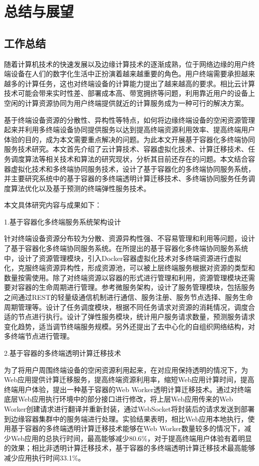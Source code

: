 \chapter{总结与展望 }\label{chap:summary_and_future_work}

\section{工作总结}

随着计算机技术的快速发展以及边缘计算技术的逐渐成熟，位于网络边缘的用户终端设备在人们的数字化生活中正扮演着越来越重要的角色。用户终端需要承担越来越多的计算任务，这也对终端设备的计算能力提出了越来越高的要求。相比云计算技术可能会带来实时性差、部署成本高、带宽拥挤等问题，利用靠近用户的设备上空闲的计算资源协同为用户终端提供就近的计算服务成为一种可行的解决方案。

基于终端设备资源的分散性、异构性等特点，如何将边缘终端设备的空闲资源管理起来并利用多终端设备协同提供服务以达到提高终端资源利用效率、提高终端用户体验的目的，成为本文需要重点解决的问题。为此本文开展基于容器化多终端协同服务技术研究。本文首先介绍了云计算技术、容器虚拟化技术、计算迁移技术、任务调度算法等相关技术和算法的研究现状，分析其目前还存在的问题。本文结合容器虚拟化技术和多终端协同服务技术，设计了基于容器化的多终端协同服务系统，并主要研究系统中的基于容器的多终端透明计算迁移技术、多终端协同服务任务调度算法优化以及基于预测的终端弹性服务技术。

本文具体研究内容与成果如下：

1.基于容器化多终端服务系统架构设计

针对终端设备资源分布较为分散、资源异构性强、不容易管理和利用等问题，设计了基于容器化多终端协同服务系统。在所提出的基于容器化多终端协同服务系统中，设计了资源管理模块，引入Docker容器虚拟化技术对多终端资源进行虚拟化，克服终端资源异构性，形成资源池，可以被上层终端服务根据对资源的类型和数量按需使用。除了对终端资源以容器的形式进行管理和利用，资源管理模块还需要对容器的生命周期进行管理。参考微服务架构，设计了服务管理模块，包括服务之间通过REST的轻量级通信机制进行通信、服务注册、服务节点选择、服务生命周期管理等。设计了任务调度模块，根据不同任务请求对资源的消耗情况，调度合适的节点进行执行。设计了弹性服务模块，统计用户服务请求数量，预测服务请求变化趋势，适当调节终端服务规模。另外还提出了去中心化的自组织网络结构，对多终端节点进行管理。

2.基于容器的多终端透明计算迁移技术

为了将用户周围终端设备的空闲资源利用起来，在对应用保持透明的情况下，为Web应用提供计算迁移服务，提高终端资源利用率，缩短Web应用计算时间，提高终端用户体验，提出一种基于容器的Web Worker透明计算迁移技术。通过对终端底层Web应用执行环境中的部分接口进行修改，将上层Web应用传来的Web Worker创建请求进行翻译并重新封装，通过WebSocket将封装后的请求发送到部署到边缘容器集群中的服务端进行处理。实验结果表明，相比Web应用本地执行，使用基于容器的多终端透明计算迁移技术能够在Web Worker数量较多的情况下，减少Web应用的总执行时间，最高能够减少80.6\%，对于提高终端用户体验有着明显的效果；相比非透明计算迁移技术，基于容器的多终端透明计算迁移技术最高能够减少应用执行时间33.1\%。

